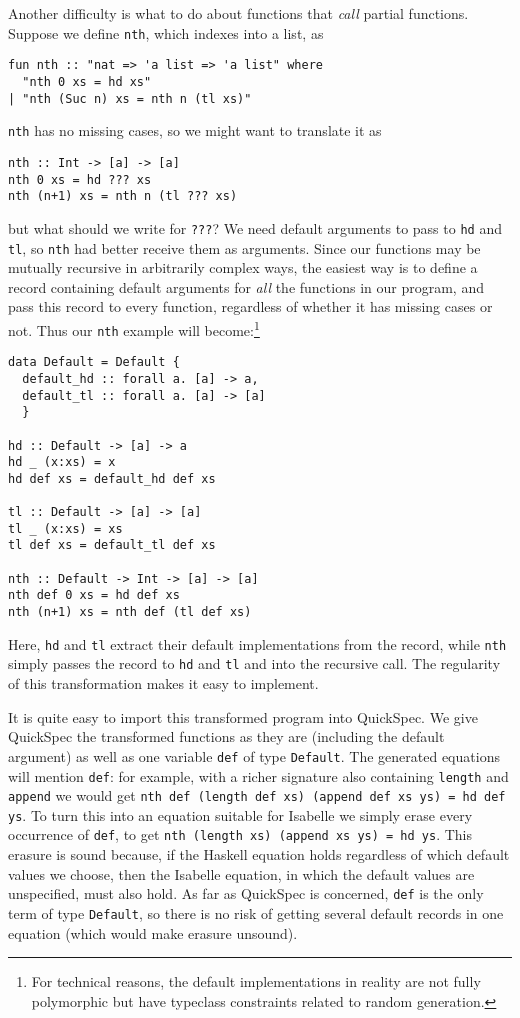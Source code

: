 Another difficulty is what to do about functions that \emph{call} partial functions.
Suppose we define \verb|nth|, which indexes into a list, as
\begin{verbatim}
fun nth :: "nat => 'a list => 'a list" where
  "nth 0 xs = hd xs"
| "nth (Suc n) xs = nth n (tl xs)"
\end{verbatim}

\verb|nth| has no missing cases, so we might want to translate it as
\begin{verbatim}
nth :: Int -> [a] -> [a]
nth 0 xs = hd ??? xs
nth (n+1) xs = nth n (tl ??? xs)
\end{verbatim}
but what should we write for \verb|???|? We need default arguments to
pass to \verb|hd| and \verb|tl|, so \verb|nth| had better receive
them as arguments. Since our functions may be mutually recursive in
arbitrarily complex ways, the easiest way is to define a record
containing default arguments for \emph{all} the functions in our
program, and pass this record to every function, regardless of whether
it has missing cases or not. Thus our \verb|nth| example will become:\footnote{For
technical reasons, the default implementations in reality are not fully
polymorphic but have typeclass constraints related to random generation.}
\begin{verbatim}
data Default = Default {
  default_hd :: forall a. [a] -> a,
  default_tl :: forall a. [a] -> [a]
  }

hd :: Default -> [a] -> a
hd _ (x:xs) = x
hd def xs = default_hd def xs

tl :: Default -> [a] -> [a]
tl _ (x:xs) = xs
tl def xs = default_tl def xs

nth :: Default -> Int -> [a] -> [a]
nth def 0 xs = hd def xs
nth (n+1) xs = nth def (tl def xs)
\end{verbatim}
Here, \verb|hd| and \verb|tl| extract their default implementations
from the record, while \verb|nth| simply passes the record to \verb|hd|
and \verb|tl| and into the recursive call. The regularity of this
transformation makes it easy to implement.

It is quite easy to import this transformed program into QuickSpec.
We give QuickSpec the transformed functions as they are (including the
default argument) as well as one variable \verb|def| of
type \verb|Default|. The generated equations will mention \verb|def|:
for example, with a richer signature also containing
\verb|length| and \verb|append| we would get
\verb|nth def (length def xs) (append def xs ys) = hd def ys|.
To turn this into an equation suitable for Isabelle we simply erase
every occurrence of \verb|def|, to get
\verb|nth (length xs) (append xs ys) = hd ys|.
This erasure is sound because, if the Haskell equation holds
regardless of which default values we choose, then the Isabelle
equation, in which the default values are unspecified, must also hold.
As far as QuickSpec is concerned, \verb|def| is the only term of type
\verb|Default|, so there is no risk of getting several default records
in one equation (which would make erasure unsound).
